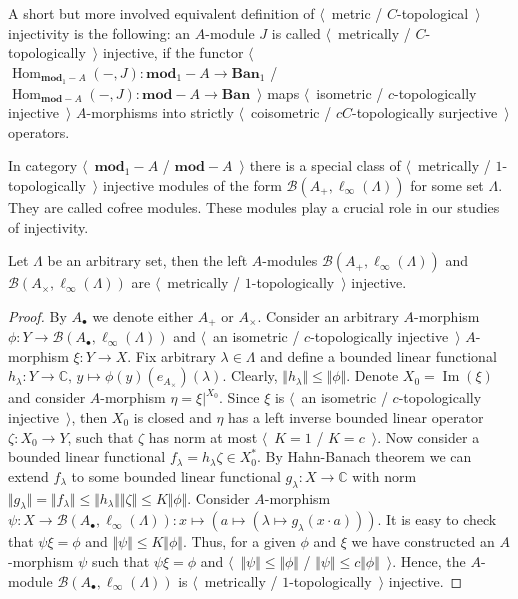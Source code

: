 A short but more involved equivalent definition 
of $\langle$~metric / $C$-topological~$\rangle$ injectivity is the following: 
an $A$-module $J$ is called $\langle$~metrically / $C$-topologically~$\rangle$ 
injective, if the functor
$\langle$~$\operatorname{Hom}_{\mathbf{mod}_1-A}(-,J)
:\mathbf{mod}_1-A\to\mathbf{Ban}_1$
/
$\operatorname{Hom}_{\mathbf{mod}-A}(-,J)
:\mathbf{mod}-A\to\mathbf{Ban}$~$\rangle$
maps $\langle$~isometric / $c$-topologically injective~$\rangle$
$A$-morphisms into strictly $\langle$~coisometric / 
$c C$-topologically surjective~$\rangle$ operators. 

In category $\langle$~$\mathbf{mod}_1-A$ / $\mathbf{mod}-A$~$\rangle$ there
is a special class of $\langle$~metrically / $1$-topologically~$\rangle$
injective modules of the form $\mathcal{B}(A_+, \ell_\infty(\Lambda))$ for 
some set $\Lambda$. They are called cofree modules. These modules play a crucial 
role in our studies of injectivity.

\begin{proposition}\label{MetCTopCofreeMod} Let $\Lambda$ be an arbitrary 
set, then the left $A$-modules $\mathcal{B}(A_+, \ell_\infty(\Lambda))$ 
and $\mathcal{B}(A_\times, \ell_\infty(\Lambda))$
are $\langle$~metrically / $1$-topologically~$\rangle$ injective. 
\end{proposition}
\begin{proof} By $A_\bullet$ we denote either $A_+$ or $A_\times$.
Consider an arbitrary $A$-morphism 
$\phi:Y\to \mathcal{B}(A_\bullet, \ell_\infty(\Lambda))$ and 
$\langle$~an isometric / $c$-topologically injective~$\rangle$ 
$A$-morphism $\xi:Y\to X$. Fix arbitrary $\lambda\in\Lambda$ and define 
a bounded linear functional 
$h_\lambda:Y\to\mathbb{C},\, y\mapsto \phi(y)(e_{A_\times})(\lambda)$. 
Clearly, $\Vert h_\lambda\Vert\leq\Vert \phi\Vert$.
Denote $X_0=\operatorname{Im}(\xi)$ and consider 
$A$-morphism $\eta=\xi|^{X_0}$. Since $\xi$ is 
$\langle$~an isometric / $c$-topologically injective~$\rangle$, then $X_0$ is
closed and $\eta$ has a left inverse bounded linear operator $\zeta:X_0\to Y$, 
such that $\zeta$ has norm at most $\langle$~$K=1$ / $K=c$~$\rangle$. 
Now consider a bounded linear functional  $f_\lambda=h_\lambda\zeta\in X_0^*$. 
By Hahn-Banach theorem we can extend $f_\lambda$ to some bounded linear functional
$g_\lambda:X\to\mathbb{C}$ with norm  
$\Vert g_\lambda\Vert
=\Vert f_\lambda\Vert
\leq\Vert h_\lambda\Vert\Vert\zeta\Vert
\leq K\Vert \phi\Vert$. 
Consider $A$-morphism 
$\psi
:X\to \mathcal{B}(A_\bullet, \ell_\infty(\Lambda))
:x\mapsto (a\mapsto (\lambda\mapsto g_\lambda(x\cdot a)))$. 
It is easy to check that $\psi\xi=\phi$ and 
$\Vert\psi\Vert\leq K\Vert\phi\Vert$. Thus, for a given $\phi$ 
and $\xi$ we have constructed an $A$-morphism $\psi$ such that $\psi\xi=\phi$ 
and $\langle$~$\Vert\psi\Vert\leq\Vert\phi\Vert$ /
$\Vert\psi\Vert\leq c\Vert\phi\Vert$~$\rangle$. Hence, the 
$A$-module $\mathcal{B}(A_\bullet, \ell_\infty(\Lambda))$ is 
$\langle$~metrically / $1$-topologically~$\rangle$ injective.
\end{proof}



